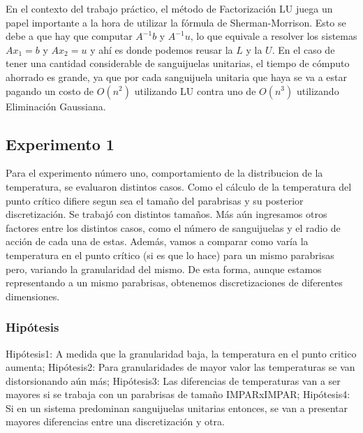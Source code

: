 \par En el contexto del trabajo práctico, el método de Factorización LU juega un papel importante a la hora de utilizar la fórmula de Sherman-Morrison. Esto se debe a que hay que computar $A^{-1}b$ y $A^{-1}u$, lo que equivale a resolver los sistemas $Ax_1 = b$ y $Ax_2 = u$ y ahí es donde podemos reusar la $L$ y la $U$. En el caso de tener una cantidad considerable de sanguijuelas unitarias, el tiempo de cómputo ahorrado es grande, ya que por cada sanguijuela unitaria que haya se va a estar pagando un costo de $O(n^2)$ utilizando LU contra uno de $O(n^3)$ utilizando Eliminación Gaussiana.

\subsection{Experimento 1}

Para el experimento número uno, comportamiento de la distribucion de la temperatura, se evaluaron distintos casos. Como el cálculo de la temperatura del punto crítico difiere segun sea el tamaño del parabrisas y su posterior discretización. Se trabajó con distintos tamaños. Más aún ingresamos otros factores entre los distintos casos, como el número de sanguijuelas y  el radio de acción de cada una de estas. Además, vamos a comparar como varía la temperatura en el punto crítico (si es que lo hace) para un mismo parabrisas pero, variando la granularidad del mismo. De esta forma, aunque estamos representando a un mismo parabrisas, obtenemos discretizaciones de diferentes dimensiones.        

\subsubsection{Hipótesis}

Hipótesis1: A medida que la granularidad baja, la temperatura en el punto critico aumenta;\newline
Hipótesis2: Para granularidades de mayor valor las temperaturas se van distorsionando aún más;\newline
Hipótesis3: Las diferencias de temperaturas van a ser mayores si se trabaja con un parabrisas de tamaño IMPARxIMPAR;\newline
Hipótesis4: Si en un sistema predominan sanguijuelas unitarias entonces, se van a presentar mayores diferencias entre una discretización y otra.\newline

